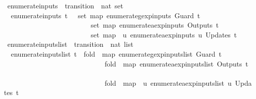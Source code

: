 \begin{isabellebody}
\isanewline
{}\isamarkupfalse%
\ enumerate{\isacharunderscore}inputs\ {\isacharcolon}{\isacharcolon}\ {\isachardoublequoteopen}transition\ {\isasymRightarrow}\ nat\ set{\isachardoublequoteclose}\ \isanewline
\ \ {\isachardoublequoteopen}enumerate{\isacharunderscore}inputs\ t\ {\isacharequal}\ {\isacharparenleft}{\isasymUnion}\ {\isacharparenleft}set\ {\isacharparenleft}map\ enumerate{\isacharunderscore}gexp{\isacharunderscore}inputs\ {\isacharparenleft}Guard\ t{\isacharparenright}{\isacharparenright}{\isacharparenright}{\isacharparenright}\ {\isasymunion}\isanewline
\ \ \ \ \ \ \ \ \ \ \ \ \ \ \ \ \ \ \ \ \ \ \ \ {\isacharparenleft}{\isasymUnion}\ {\isacharparenleft}set\ {\isacharparenleft}map\ enumerate{\isacharunderscore}aexp{\isacharunderscore}inputs\ {\isacharparenleft}Outputs\ t{\isacharparenright}{\isacharparenright}{\isacharparenright}{\isacharparenright}\ {\isasymunion}\isanewline
\ \ \ \ \ \ \ \ \ \ \ \ \ \ \ \ \ \ \ \ \ \ \ \ {\isacharparenleft}{\isasymUnion}\ {\isacharparenleft}set\ {\isacharparenleft}map\ {\isacharparenleft}{\isasymlambda}{\isacharparenleft}{\isacharunderscore}{\isacharcomma}\ u{\isacharparenright}{\isachardot}\ enumerate{\isacharunderscore}aexp{\isacharunderscore}inputs\ u{\isacharparenright}\ {\isacharparenleft}Updates\ t{\isacharparenright}{\isacharparenright}{\isacharparenright}{\isacharparenright}{\isachardoublequoteclose}\isanewline
\isanewline
{}\isamarkupfalse%
\ enumerate{\isacharunderscore}inputs{\isacharunderscore}list\ {\isacharcolon}{\isacharcolon}\ {\isachardoublequoteopen}transition\ {\isasymRightarrow}\ nat\ list{\isachardoublequoteclose}\ \isanewline
\ \ {\isachardoublequoteopen}enumerate{\isacharunderscore}inputs{\isacharunderscore}list\ t\ {\isacharequal}\ {\isacharparenleft}fold\ {\isacharparenleft}{\isacharat}{\isacharparenright}\ {\isacharparenleft}map\ enumerate{\isacharunderscore}gexp{\isacharunderscore}inputs{\isacharunderscore}list\ {\isacharparenleft}Guard\ t{\isacharparenright}{\isacharparenright}\ {\isacharbrackleft}{\isacharbrackright}{\isacharparenright}\ {\isacharat}\isanewline
\ \ \ \ \ \ \ \ \ \ \ \ \ \ \ \ \ \ \ \ \ \ \ \ \ \ \ \ \ {\isacharparenleft}fold\ {\isacharparenleft}{\isacharat}{\isacharparenright}\ {\isacharparenleft}map\ enumerate{\isacharunderscore}aexp{\isacharunderscore}inputs{\isacharunderscore}list\ {\isacharparenleft}Outputs\ t{\isacharparenright}{\isacharparenright}\ {\isacharbrackleft}{\isacharbrackright}{\isacharparenright}\ {\isacharat}\isanewline
\ \ \ \ \ \ \ \ \ \ \ \ \ \ \ \ \ \ \ \ \ \ \ \ \ \ \ \ \ {\isacharparenleft}fold\ {\isacharparenleft}{\isacharat}{\isacharparenright}\ {\isacharparenleft}map\ {\isacharparenleft}{\isasymlambda}{\isacharparenleft}{\isacharunderscore}{\isacharcomma}\ u{\isacharparenright}{\isachardot}\ enumerate{\isacharunderscore}aexp{\isacharunderscore}inputs{\isacharunderscore}list\ u{\isacharparenright}\ {\isacharparenleft}Updates\ t{\isacharparenright}{\isacharparenright}\ {\isacharbrackleft}{\isacharbrackright}{\isacharparenright}{\isachardoublequoteclose}\isanewline

\end{isabellebody}

